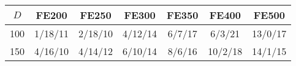 \begin{tabular}{c c c c c c c}\hline\hline
	$D$	&	FE200	&	FE250	&	FE300	&	FE350	&	FE400	&	FE500	\\ \hline
	100	&	1/18/11	&	2/18/10	&	4/12/14	&	6/7/17	&	6/3/21	&	13/0/17	\\
	150	&	4/16/10	&	4/14/12	&	6/10/14	&	8/6/16	&	10/2/18	&	14/1/15	\\ \hline
\end{tabular}
	